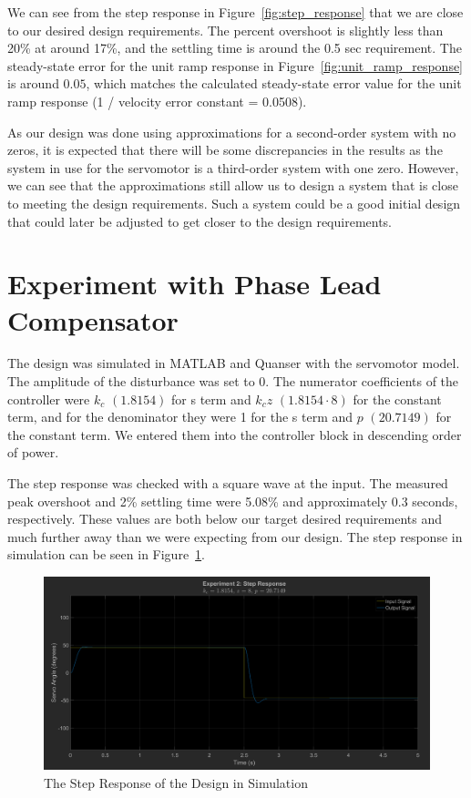 \documentclass[12pt]{article}
\begin{document}
We can see from the step response in Figure~\ref{fig:step_response} that we are close to our desired design requirements. The percent overshoot is slightly less than 20\% at around 17\%, and the settling time is around the 0.5 sec requirement. The steady-state error for the unit ramp response in Figure~\ref{fig:unit_ramp_response} is around $0.05$, which matches the calculated steady-state error value for the unit ramp response (1 / velocity error constant = 0.0508). 

As our design was done using approximations for a second-order system with no zeros, it is expected that there will be some discrepancies in the results as the system in use for the servomotor is a third-order system with one zero. However, we can see that the approximations still allow us to design a system that is close to meeting the design requirements. Such a system could be a good initial design that could later be adjusted to get closer to the design requirements.

\section{Experiment with Phase Lead Compensator}
The design was simulated in MATLAB and Quanser with the servomotor model. The amplitude of the disturbance was set to 0. The numerator coefficients of the controller were $k_c$ $(1.8154)$ for s term and $k_cz$ $(1.8154 \cdot 8)$ for the constant term, and for the denominator they were 1 for the s term and $p$ $(20.7149)$ for the constant term. We entered them into the controller block in descending order of power.

The step response was checked with a square wave at the input. The measured peak overshoot and 2\% settling time were 5.08\% and approximately 0.3 seconds, respectively. These values are both below our target desired requirements and much further away than we were expecting from our design. The step response in simulation can be seen in Figure~\ref{fig:exp2_step}.

\begin{figure}[h!]
	\centering
	\includegraphics[width=\textwidth]{exp2_step_response}
	\caption{\label{fig:exp2_step}The Step Response of the Design in Simulation}
\end{figure}
\end{document}
